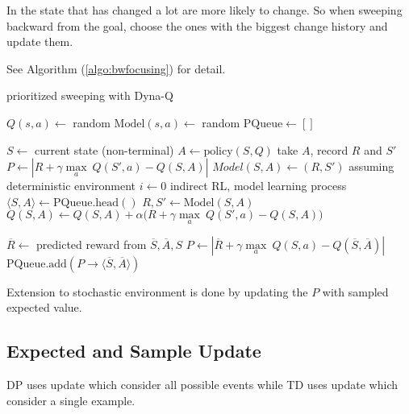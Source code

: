 In  the state that has changed a lot are more likely to change. So when sweeping backward from the goal, choose the ones with the biggest change history and update them. 



See Algorithm (\ref{algo:bwfocusing}) for detail.


\begin{algorithm}
	\caption{prioritized sweeping with Dyna-Q}\label{algo:bwfocusing}	
	
	\begin{algorithmic}[1]
		\State $Q(s,a) \gets$ random
		\State $\text{Model}(s,a) \gets$ random
		\State $\text{PQueue} \gets []$
		
		\Statex
		
		\Loop
			\State $S \gets$ current state (non-terminal)
			\State $A \gets \text{policy}(S,Q)$
			\State take $A$, record $R$ and $S\prime$
			\State $P \gets |R + \gamma \underset{a}{\max}\ Q(S',a) - Q(S,A)|$
			\State $Model(S,A) \gets (R,S')$ \Comment assuming deterministic environment
			\State $i \gets 0$
			\Repeat \Comment indirect RL, model learning process
				\State $\langle S, A\rangle \gets \text{PQueue.head}()$
				\State $R,S' \gets \text{Model}(S,A)$
				\State $Q(S,A) \gets Q(S,A) + \alpha \Big(R + \gamma \underset{a}{\max}\ Q(S',a) - Q(S,A ) \Big) $
				
					\State $\overline{R} \gets$ predicted reward from $\overline{S}, \overline{A}, S$
					\State $P \gets |\overline{R} + \gamma \underset{a}{\max}\ Q(S,a) - Q(\overline{S}, \overline{A})|$
						\State $\text{PQueue.add}(P \rightarrow \langle \overline{S}, \overline{A} \rangle )$
					\EndIf
				\EndFor
		\EndLoop
	\end{algorithmic}
\end{algorithm}

Extension to stochastic environment is done by updating the $P$ with sampled expected value.



\subsection{Expected and Sample Update}

DP uses  update which consider all possible events while TD uses  update which consider a single example.

